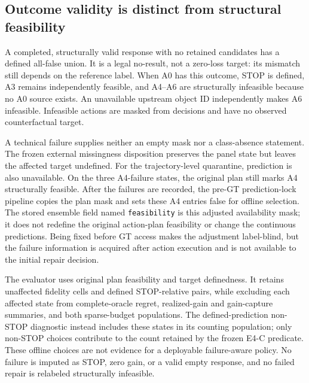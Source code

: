 \subsection{Outcome validity is distinct from structural feasibility}
A completed, structurally valid response with no retained candidates has a
defined all-false union. It is a legal no-result, not a zero-loss target:
its mismatch still depends on the reference label. When A0 has this outcome,
STOP is defined, A3 remains independently feasible, and A4--A6 are
structurally infeasible because no A0 source exists. An unavailable upstream
object ID independently makes A6 infeasible. Infeasible actions are masked
from decisions and have no observed counterfactual target.

A technical failure supplies neither an empty mask nor a class-absence
statement. The frozen external missingness disposition preserves the panel
state but leaves the affected target undefined. For the trajectory-level
quarantine, prediction is also unavailable. On the three A4-failure states,
the original plan still marks A4 structurally feasible. After the failures
are recorded, the pre-GT prediction-lock pipeline copies the plan mask and
sets these A4 entries false for offline selection. The stored ensemble field
named \texttt{feasibility} is this adjusted availability mask; it does not
redefine the original action-plan feasibility or change the continuous
predictions. Being fixed before GT access makes the adjustment label-blind,
but the failure information is acquired after action execution and is not
available to the initial repair decision.

The evaluator uses original plan feasibility and target definedness. It
retains unaffected fidelity cells and defined STOP-relative pairs, while
excluding each affected state from complete-oracle regret, realized-gain
and gain-capture summaries, and both sparse-budget populations. The
defined-prediction non-STOP diagnostic instead includes these states in its
counting population; only non-STOP choices contribute to the count retained
by the frozen E4-C predicate. These offline
choices are not evidence for a deployable failure-aware policy. No failure
is imputed as STOP, zero gain, or a valid empty response, and no failed
repair is relabeled structurally infeasible.

